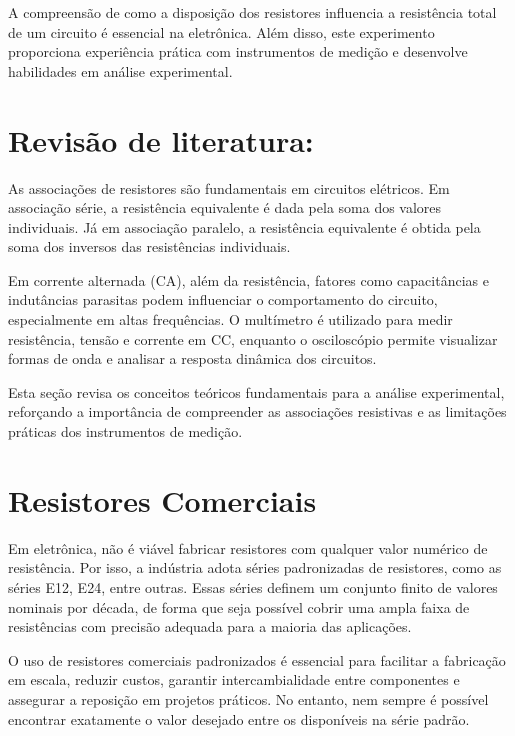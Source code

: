 \documentclass[conference]{IEEEtran}
\begin{document}
A compreensão de como a disposição dos resistores influencia a resistência total de um circuito é essencial na eletrônica. Além disso, este experimento proporciona experiência prática com instrumentos de medição e desenvolve habilidades em análise experimental.

\section{Revisão de literatura:}

As associações de resistores são fundamentais em circuitos elétricos.
Em associação série, a resistência equivalente é dada pela soma dos valores individuais.%
Já em associação paralelo, a resistência equivalente é obtida pela soma dos inversos das resistências individuais.

Em corrente alternada (CA), além da resistência,
fatores como capacitâncias e indutâncias parasitas podem influenciar o comportamento do circuito, especialmente em altas frequências. %
O multímetro é utilizado para medir resistência, tensão e corrente em CC, enquanto o osciloscópio permite visualizar formas de onda e analisar a resposta dinâmica dos circuitos.

Esta seção revisa os conceitos teóricos fundamentais para a análise experimental, reforçando a importância de compreender as associações resistivas e as limitações práticas dos instrumentos de medição.

\section{Resistores Comerciais}

Em eletrônica, não é viável fabricar resistores com qualquer valor numérico de resistência. Por isso, a indústria adota séries padronizadas de resistores, como as séries E12, E24, entre outras. %
Essas séries definem um conjunto finito de valores nominais por década, de forma que seja possível cobrir uma ampla faixa de resistências com precisão adequada para a maioria das aplicações.

O uso de resistores comerciais padronizados é essencial para facilitar a fabricação em escala, reduzir custos, garantir intercambialidade entre componentes e assegurar a reposição em projetos práticos. No entanto, nem sempre é possível encontrar exatamente o valor desejado entre os disponíveis na série padrão. %
\end{document}
